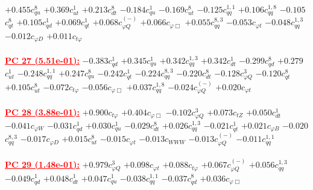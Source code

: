 \documentclass{article}
\begin{document}
{$+0.455$}{\rm $c_{qu}^{8}$} 
{$+0.369$}{\rm $c_{ut}^{1}$} 
{$+0.213$}{\rm $c_{dt}^{8}$} 
{$-0.184$}{\rm $c_{qu}^{1}$} 
{$-0.169$}{\rm $c_{ut}^{8}$} 
{$-0.125$}{\rm $c_{qq}^{1,1}$} 
{$+0.106$}{\rm $c_{qq}^{1,8}$} 
{$-0.105$}{\rm $c_{qt}^{8}$} 
{$+0.105$}{\rm $c_{qd}^{1}$} 
{$+0.069$}{\rm $c_{qt}^{1}$} 
{$+0.068$}{\rm $c_{\varphi Q}^{(-)}$} 
{$+0.066$}{\rm $c_{\varphi \Box}$} 
{$+0.055$}{\rm $c_{qq}^{8,3}$} 
{$-0.053$}{\rm $c_{\varphi t}$} 
{$-0.048$}{\rm $c_{qq}^{1,3}$} 
{$-0.012$}{\rm $c_{\varphi D}$} 
{$+0.011$}{\rm $c_{t \varphi}$} 
 \nonumber \\ \nonumber \\ 
\noindent \textcolor{red}{\underline{\bf{PC 27} (5.51e-01):}}
{$-0.383$}{\rm $c_{qd}^{1}$} 
{$+0.345$}{\rm $c_{qu}^{1}$} 
{$+0.342$}{\rm $c_{qq}^{1,3}$} 
{$+0.342$}{\rm $c_{dt}^{1}$} 
{$-0.299$}{\rm $c_{qd}^{8}$} 
{$+0.279$}{\rm $c_{ut}^{1}$} 
{$-0.248$}{\rm $c_{qq}^{1,1}$} 
{$+0.247$}{\rm $c_{qu}^{8}$} 
{$-0.242$}{\rm $c_{qt}^{1}$} 
{$-0.224$}{\rm $c_{qq}^{8,3}$} 
{$-0.220$}{\rm $c_{dt}^{8}$} 
{$-0.128$}{\rm $c_{\varphi Q}^{3}$} 
{$-0.120$}{\rm $c_{qt}^{8}$} 
{$+0.105$}{\rm $c_{ut}^{8}$} 
{$-0.072$}{\rm $c_{t \varphi}$} 
{$-0.056$}{\rm $c_{\varphi \Box}$} 
{$+0.037$}{\rm $c_{qq}^{1,8}$} 
{$-0.024$}{\rm $c_{\varphi Q}^{(-)}$} 
{$+0.020$}{\rm $c_{\varphi t}$} 
 \nonumber \\ \nonumber \\ 
\noindent \textcolor{red}{\underline{\bf{PC 28} (3.88e-01):}}
{$+0.900$}{\rm $c_{t \varphi}$} 
{$+0.404$}{\rm $c_{\varphi \Box}$} 
{$-0.102$}{\rm $c_{\varphi Q}^{3}$} 
{$+0.073$}{\rm $c_{tZ}$} 
{$+0.050$}{\rm $c_{dt}^{1}$} 
{$-0.041$}{\rm $c_{\varphi W}$} 
{$-0.031$}{\rm $c_{qd}^{1}$} 
{$+0.030$}{\rm $c_{qu}^{1}$} 
{$-0.029$}{\rm $c_{dt}^{8}$} 
{$+0.026$}{\rm $c_{qq}^{1,3}$} 
{$-0.021$}{\rm $c_{qt}^{1}$} 
{$+0.021$}{\rm $c_{\varphi B}$} 
{$-0.020$}{\rm $c_{qq}^{8,3}$} 
{$-0.017$}{\rm $c_{\varphi D}$} 
{$+0.015$}{\rm $c_{ut}^{8}$} 
{$-0.015$}{\rm $c_{\varphi t}$} 
{$-0.013$}{\rm $c_{WWW}$} 
{$-0.013$}{\rm $c_{\varphi Q}^{(-)}$} 
{$-0.011$}{\rm $c_{qq}^{1,1}$} 
 \nonumber \\ \nonumber \\ 
\noindent \textcolor{red}{\underline{\bf{PC 29} (1.48e-01):}}
{$+0.979$}{\rm $c_{\varphi Q}^{3}$} 
{$+0.098$}{\rm $c_{\varphi t}$} 
{$+0.088$}{\rm $c_{t \varphi}$} 
{$+0.067$}{\rm $c_{\varphi Q}^{(-)}$} 
{$+0.056$}{\rm $c_{qq}^{1,3}$} 
{$-0.049$}{\rm $c_{qd}^{1}$} 
{$+0.048$}{\rm $c_{dt}^{1}$} 
{$+0.047$}{\rm $c_{qu}^{1}$} 
{$-0.038$}{\rm $c_{qq}^{1,1}$} 
{$-0.037$}{\rm $c_{qd}^{8}$} 
{$+0.036$}{\rm $c_{\varphi \Box}$} 
\end{document}
